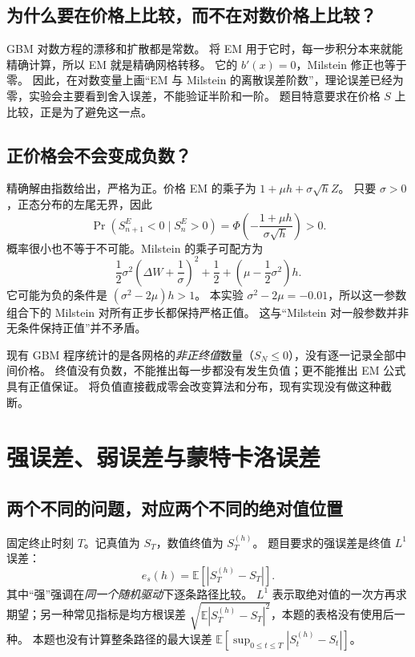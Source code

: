 \documentclass[11pt,a4paper,fontset=none]{ctexart}
\numberwithin{equation}{section}
\newcommand{\E}{\mathbb E}
\begin{document}
\subsection{为什么要在价格上比较，而不在对数价格上比较？}
GBM 对数方程的漂移和扩散都是常数。
将 EM 用于它时，每一步积分本来就能精确计算，所以 EM 就是精确网格转移。
它的 $b'(x)=0$，Milstein 修正也等于零。
因此，在对数变量上画“EM 与 Milstein 的离散误差阶数”，理论误差已经为零，实验会主要看到舍入误差，不能验证半阶和一阶。
题目特意要求在价格 $S$ 上比较，正是为了避免这一点。

\subsection{正价格会不会变成负数？}
精确解由指数给出，严格为正。价格 EM 的乘子为 $1+\mu h+\sigma\sqrt h Z$。
只要 $\sigma>0$，正态分布的左尾无界，因此
\begin{equation}\label{eq:methods-em-negative}
 \Pr(S_{n+1}^{E}<0\mid S_n^{E}>0)
 =\Phi\left(-\frac{1+\mu h}{\sigma\sqrt h}\right)>0.
\end{equation}
概率很小也不等于不可能。Milstein 的乘子可配方为
\begin{equation}\label{eq:methods-mil-positive}
 \frac12\sigma^2\left(\Delta W+\frac1\sigma\right)^2
 +\frac12+\left(\mu-\frac12\sigma^2\right)h.
\end{equation}
它可能为负的条件是 $(\sigma^2-2\mu)h>1$。
本实验 $\sigma^2-2\mu=-0.01$，所以这一参数组合下的 Milstein 对所有正步长都保持严格正值。
这与“Milstein 对一般参数并非无条件保持正值”并不矛盾。

现有 GBM 程序统计的是各网格的\emph{非正终值}数量（$S_N\le0$），没有逐一记录全部中间价格。
终值没有负数，不能推出每一步都没有发生负值；更不能推出 EM 公式具有正值保证。
将负值直接截成零会改变算法和分布，现有实现没有做这种截断。

\section{强误差、弱误差与蒙特卡洛误差}\label{sec:errors}
\subsection{两个不同的问题，对应两个不同的绝对值位置}
固定终止时刻 $T$。记真值为 $S_T$，数值终值为 $S_T^{(h)}$。
题目要求的强误差是终值 $L^1$ 误差：
\begin{equation}\label{eq:errors-strong}
 e_s(h)=\E\left[|S_T^{(h)}-S_T|\right].
\end{equation}
其中“强”强调在\emph{同一个随机驱动}下逐条路径比较。
$L^1$ 表示取绝对值的一次方再求期望；另一种常见指标是均方根误差 $\sqrt{\E|S_T^{(h)}-S_T|^2}$，本题的表格没有使用后一种。
本题也没有计算整条路径的最大误差 $\E[\sup_{0\le t\le T}|S_t^{(h)}-S_t|]$。
\end{document}

